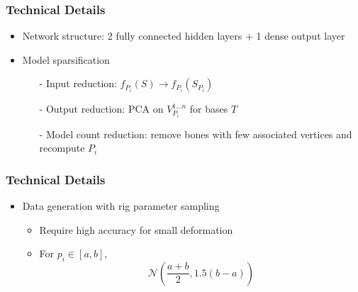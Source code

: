 \documentclass[serif,mathserif, 12pt]{beamer}
\begin{document}
\begin{frame}
  \frametitle{Technical Details}
  \begin{itemize}
  \item Network structure: 2 fully connected hidden layers + 1 dense output layer
  \item Model sparsification
    \begin{itemize}
    \item[-] Input reduction: $f_{P_i}(S) \rightarrow f_{P_i}(S_{P_i})$
      \pause
    \item[-] Output reduction: PCA on $V_{P_i}^{1\dots n}$ for bases $T$
      \pause
    \item[-] Model count reduction: remove bones with few associated vertices and recompute $P_i$
    \end{itemize}
  \end{itemize}
\end{frame}

\begin{frame}
  \frametitle{Technical Details}
  \begin{itemize}
  \item Data generation with rig parameter sampling
    \begin{itemize}
    \item Require high accuracy for small deformation
    \item For $p_i \in [a, b]$,
      \[
      \mathcal{N}(\frac{a+b}{2}, 1.5(b-a))
      \]
    \end{itemize}
  \end{itemize}
\end{frame}

\begin{frame}
\end{frame}
\end{document}
